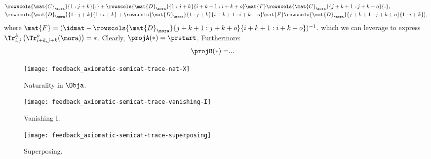 {\begin{example}
\begin{equation}
\begin{aligned}
                                                 & \rowscols{\mat{C}_\mora}{1:j+k}{:}+\rowscols{\mat{D}_\mora}{1:j+k}{i+k+1:i+k+o}\mat{F}\rowscols{\mat{C}_\mora}{j+k+1:j+k+o}{:}, \\
                                                 & \rowscols{\mat{D}_\mora}{1:j+k}{1:i+k}+\rowscols{\mat{D}_\mora}{1:j+k}{i+k+1:i+k+o}\mat{F} \rowscols{\mat{D}_\mora}{j+k+1:j+k+o}{1:i+k}\rangle,
            \end{aligned}
        \end{equation}
        where $\mat{F}=(\idmat-\rowscols{\mat{D}_\mora}{j+k+1:j+k+o}{i+k+1:i+k+o})^{-1}$.
        which we can leverage to express $\Tr_{i,j}^{k}\left(\Tr_{i+k,j+k}^o(\mora)\right)=\ast$.
        Clearly, $\projA(\ast)=\prstart$.
        Furthermore:
        \begin{equation*}
            \begin{aligned}
                \projB(\ast)= & .
                ..
            \end{aligned}
        \end{equation*}

    \end{example}}

\begin{figure}[h!]
    \centering
    \texttt{[image: feedback\_axiomatic-semicat-trace-nat-X]}
    \caption{Naturality in $\Obja$.}
    \label{fig:axiomatic-semicat-trace-nat-X}
\end{figure}

\begin{figure}[h!]
    \centering
    \texttt{[image: feedback\_axiomatic-semicat-trace-vanishing-I]}
    \caption{Vanishing I.}
    \label{fig:axiomatic-semicat-trace-vanishing-I}
\end{figure}

\begin{figure}[h!]
    \centering
    \texttt{[image: feedback\_axiomatic-semicat-trace-superposing]}
    \caption{Superposing.}
    \label{fig:axiomatic-semicat-trace-superposing}
\end{figure}

